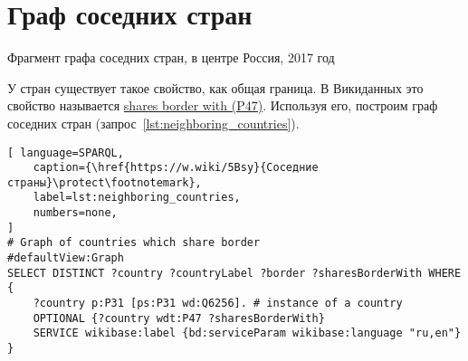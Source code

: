 



\newpage
\section{Граф соседних стран}
%
\begin{marginfigure}%
	{
		\setlength{\fboxsep}{0pt}%
		\setlength{\fboxrule}{1pt}%
	}
    \caption[Фрагмент графа соседних стран, 2017 год.]{Фрагмент графа соседних стран, в центре Россия, 2017 год}
	\label{fig:neighboring_countries_2017}%
\end{marginfigure}


У стран существует такое свойство, как общая граница. 
В Викиданных это свойство называется 
\href{https://www.wikidata.org/wiki/Property:P47}{shares border with (P47)}. 
Используя его, построим граф соседних стран (запрос~\ref{lst:neighboring_countries}).

\begin{lstlisting}[ language=SPARQL, 
    caption={\href{https://w.wiki/5Bsy}{Соседние страны}\protect\footnotemark},
    label=lst:neighboring_countries, 
    numbers=none,
]
# Graph of countries which share border
#defaultView:Graph
SELECT DISTINCT ?country ?countryLabel ?border ?sharesBorderWith WHERE
{
    ?country p:P31 [ps:P31 wd:Q6256]. # instance of a country
    OPTIONAL {?country wdt:P47 ?sharesBorderWith}
    SERVICE wikibase:label {bd:serviceParam wikibase:language "ru,en"}
}
\end{lstlisting}

